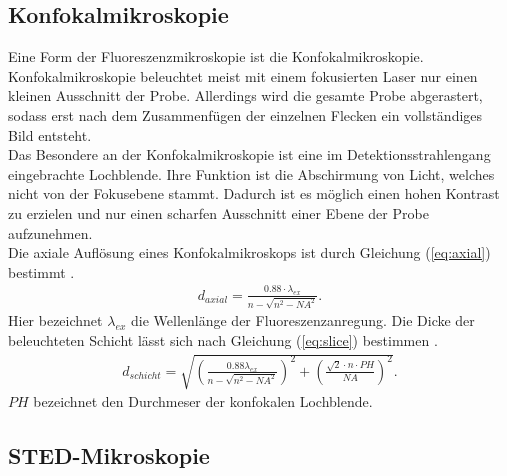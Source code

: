 \subsection{Konfokalmikroskopie}
Eine Form der Fluoreszenzmikroskopie ist die Konfokalmikroskopie. 
Konfokalmikroskopie beleuchtet meist mit einem fokusierten Laser nur einen kleinen Ausschnitt der Probe. Allerdings wird die gesamte Probe abgerastert, sodass erst nach dem Zusammenfügen der einzelnen Flecken ein vollständiges Bild entsteht.
\\
Das Besondere an der Konfokalmikroskopie ist eine im Detektionsstrahlengang eingebrachte Lochblende. Ihre Funktion ist die Abschirmung von Licht, welches nicht von der Fokusebene stammt. Dadurch ist es möglich einen hohen Kontrast zu erzielen und nur einen scharfen Ausschnitt einer Ebene der Probe aufzunehmen.
\\
Die axiale Auflösung eines Konfokalmikroskops ist durch Gleichung (\ref{eq:axial}) bestimmt \cite{beyer}.
\begin{align}
	d_{axial} = \frac{0.88\cdot \lambda_{ex}}{n-\sqrt{n^2-NA^2}}. \label{eq:axial}
\end{align}
Hier bezeichnet $\lambda_{ex}$ die Wellenlänge der Fluoreszenzanregung. 
Die Dicke der beleuchteten Schicht lässt sich nach Gleichung (\ref{eq:slice}) bestimmen \cite{beyer}.
\begin{align}
	d_{schicht} = \sqrt{\left( \frac{0.88\lambda_{ex}}{n-\sqrt{n^2-NA^2}}\right)^2 + \left( \frac{\sqrt{2}\cdot n \cdot PH}{NA}\right)^2}. \label{eq:slice}
\end{align}
$PH$ bezeichnet den Durchmeser der konfokalen Lochblende.
\subsection{STED-Mikroskopie}
